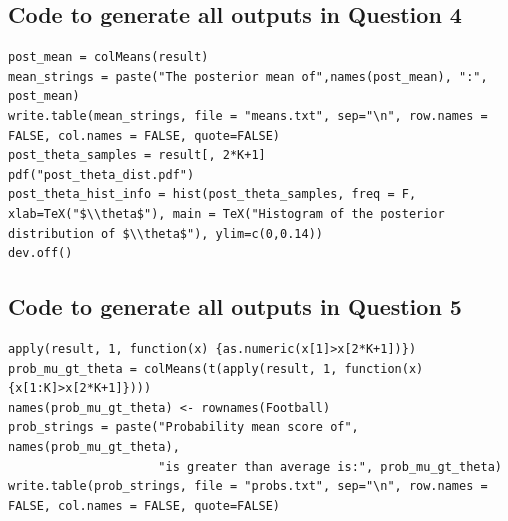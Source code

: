 \documentclass[11pt]{article} %
\begin{document}
\subsection*{Code to generate all outputs in Question 4}
\begin{lstlisting}
post_mean = colMeans(result)
mean_strings = paste("The posterior mean of",names(post_mean), ":", post_mean)
write.table(mean_strings, file = "means.txt", sep="\n", row.names = FALSE, col.names = FALSE, quote=FALSE)
post_theta_samples = result[, 2*K+1]
pdf("post_theta_dist.pdf")
post_theta_hist_info = hist(post_theta_samples, freq = F, xlab=TeX("$\\theta$"), main = TeX("Histogram of the posterior distribution of $\\theta$"), ylim=c(0,0.14))
dev.off()
\end{lstlisting}
\subsection*{Code to generate all outputs in Question 5}
\begin{lstlisting}
apply(result, 1, function(x) {as.numeric(x[1]>x[2*K+1])})
prob_mu_gt_theta = colMeans(t(apply(result, 1, function(x) {x[1:K]>x[2*K+1]})))
names(prob_mu_gt_theta) <- rownames(Football)
prob_strings = paste("Probability mean score of", names(prob_mu_gt_theta), 
                     "is greater than average is:", prob_mu_gt_theta)
write.table(prob_strings, file = "probs.txt", sep="\n", row.names = FALSE, col.names = FALSE, quote=FALSE)
\end{lstlisting}
\end{document}
